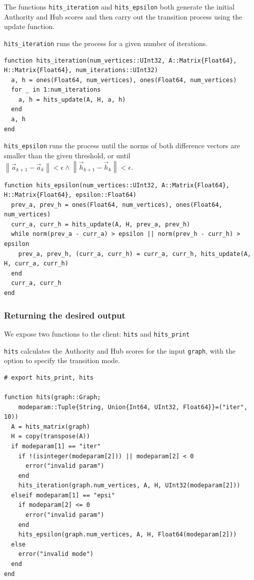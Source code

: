 \documentclass[12pt, titlepage, twoside]{amsart}
\begin{document}
The functions \texttt{hits_iteration} and \texttt{hits_epsilon}
both generate the initial Authority and Hub scores and then carry out the transition process using the update function.

\texttt{hits_iteration} runs the process for a given number of iterations.

\begin{verbatim}
function hits_iteration(num_vertices::UInt32, A::Matrix{Float64}, H::Matrix{Float64}, num_iterations::UInt32)
  a, h = ones(Float64, num_vertices), ones(Float64, num_vertices)
  for _ in 1:num_iterations
    a, h = hits_update(A, H, a, h)
  end
  a, h
end
\end{verbatim}

\texttt{hits_epsilon} runs the process until the norms of both difference vectors are smaller than 
the given threshold, or until
$\left\lVert
  \vec{a}_{k + 1} - \vec{a}_k
\right\rVert < \epsilon
\wedge
\left\lVert
  \vec{h}_{k + 1} - \vec{h}_k
\right\rVert < \epsilon$.

\begin{verbatim}
function hits_epsilon(num_vertices::UInt32, A::Matrix{Float64}, H::Matrix{Float64}, epsilon::Float64)
  prev_a, prev_h = ones(Float64, num_vertices), ones(Float64, num_vertices)
  curr_a, curr_h = hits_update(A, H, prev_a, prev_h)
  while norm(prev_a - curr_a) > epsilon || norm(prev_h - curr_h) > epsilon
    prev_a, prev_h, (curr_a, curr_h) = curr_a, curr_h, hits_update(A, H, curr_a, curr_h)
  end
  curr_a, curr_h
end
\end{verbatim}

\subsubsection{Returning the desired output}

We expose two functions to the client: \texttt{hits} and \texttt{hits_print}

\texttt{hits} calculates the Authority and Hub scores for the input \texttt{graph},
with the option to specify the transition mode.

\begin{verbatim}
# export hits_print, hits

function hits(graph::Graph;
    modeparam::Tuple{String, Union{Int64, UInt32, Float64}}=("iter", 10))
  A = hits_matrix(graph)
  H = copy(transpose(A))
  if modeparam[1] == "iter"
    if !(isinteger(modeparam[2])) || modeparam[2] < 0
      error("invalid param")
    end
    hits_iteration(graph.num_vertices, A, H, UInt32(modeparam[2]))
  elseif modeparam[1] == "epsi"
    if modeparam[2] <= 0
      error("invalid param")
    end
    hits_epsilon(graph.num_vertices, A, H, Float64(modeparam[2]))
  else
    error("invalid mode")
  end
end
\end{verbatim}
\end{document}
